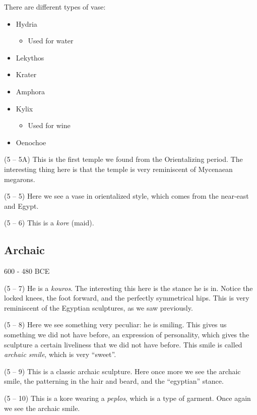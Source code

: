 \documentclass{article}
\begin{document}
\begin{spacing}{1.2}
    There are different types of vase:
    \begin{itemize}
        \item Hydria
        \begin{itemize}
            \item Used for water
        \end{itemize}
        \item Lekythos
        \item Krater
        \item Amphora
        \item Kylix
        \begin{itemize}
            \item Used for wine
        \end{itemize}
        \item Oenochoe
    \end{itemize}
    
    (5 -- 5A) This is the first temple we found from the Orientalizing period. The interesting thing here is that the temple is very reminiscent of Mycenaean megarons.

    (5 -- 5) Here we see a vase in orientalized style, which comes from the near-east and Egypt. 

    (5 -- 6) This is a \emph{kore} (maid). 

    \subsection{Archaic}
    \begin{flushright}
        600 - 480 BCE
    \end{flushright}
    (5 -- 7) He is a \emph{kouros}. The interesting this here is the stance he is in. Notice the locked knees, the foot forward, and the perfectly symmetrical hips. This is very reminiscent of the Egyptian sculptures, as we saw previously.

    (5 -- 8) Here we see something very peculiar: he is smiling. This gives us something we did not have before, an expression of personality, which gives the sculpture a certain liveliness that we did not have before. This smile is called \emph{archaic smile}, which is very ``sweet''. 

    (5 -- 9) This is a classic archaic sculpture. Here once more we see the archaic smile, the patterning in the hair and beard, and the ``egyptian'' stance. 

    (5 -- 10) This is a kore wearing a \emph{peplos}, which is a type of garment. Once again we see the archaic smile. 


\end{spacing}
\end{document}
